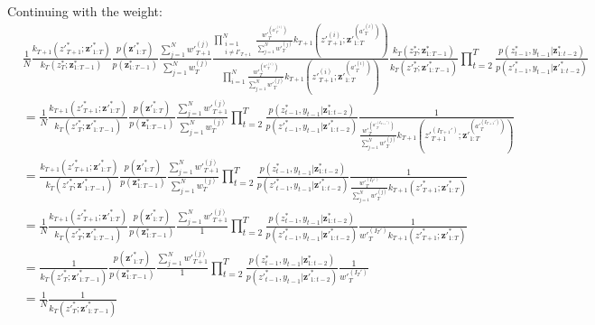\documentclass[11pt]{article}
\newcommand{\z}{\mathbf{z}}
\begin{document}
Continuing with the weight:
\begin{align*}
&
\frac{1}{N} \frac{
k_{T+1}({z'}_{T+1}^*; {\z'}_{1:T}^*) 
}{
k_T(z_T^*; \z_{1:T-1}^*)
}
\frac{p({\z'}_{1:T}^*)}{p({\z}_{1:T-1}^*)}
\frac{
\sum_{j=1}^N {w'}_{T+1}^{(j)}
}{
\sum_{j=1}^N {w}_{T}^{(j)}
}
\frac{
\displaystyle \prod_{\substack{i=1\\i \ne I'_{T+1}}}^N \frac{{w'}_{T}^{({a'}_{T}^{(i)})}}{\sum_{j=1}^N {w'}_{T}^{(j)}} k_{T+1}({z'}_{T+1}^{(i)}; {\z'}_{1:T}^{({a'}_{T}^{(i)})} )
}{
\displaystyle \prod_{i=1}^N \frac{{w'}_{T}^{({a'}_{T}^{(i)})}}{\sum_{j=1}^N {w'}_{T}^{(j)}} k_{T+1}({z'}_{T+1}^{(i)}; {\z'}_{1:T}^{({a'}_{T}^{(i)})} )
}
\frac{
k_T(z_T^*; \z_{1:T-1}^*)
}{
k_T({z'}_T^*; {\z'}_{1:T-1}^*)
}
\prod_{t=2}^T \frac{p(z_{t-1}^*, y_{t-1} | {\z}_{1:t-2}^{*})}{p({z'}_{t-1}^*, y_{t-1} | {\z'}_{1:t-2}^*)}\\
&=
\frac{1}{N} \frac{
k_{T+1}({z'}_{T+1}^*; {\z'}_{1:T}^*)
}{
k_T({z'}_T^*; {\z'}_{1:T-1}^*)
}
\frac{p({\z'}_{1:T}^*)}{p({\z}_{1:T-1}^*)}
\frac{
\sum_{j=1}^N {w'}_{T+1}^{(j)}
}{
\sum_{j=1}^N {w}_{T}^{(j)}
}
\prod_{t=2}^T \frac{p(z_{t-1}^*, y_{t-1} | {\z}_{1:t-2}^{*})}{p({z'}_{t-1}^*, y_{t-1} | {\z'}_{1:t-2}^*)}
\frac{1}{
\frac{{w'}_{T}^{({a'}_{T}^{(I_{T+1}')})}}{\sum_{j=1}^N {w'}_{T}^{(j)}} k_{T+1}({z'}_{T+1}^{(I_{T+1}')}; {\z'}_{1:T}^{({a'}_{T}^{(I_{T+1}')})} )
}\\
&=
\frac{
k_{T+1}({z'}_{T+1}^*; {\z'}_{1:T}^*)
}{
k_T({z'}_T^*; {\z'}_{1:T-1}^*)
}
\frac{p({\z'}_{1:T}^*)}{p({\z}_{1:T-1}^*)}
\frac{
\sum_{j=1}^N {w'}_{T+1}^{(j)}
}{
\sum_{j=1}^N {w}_{T}^{(j)}
}
\prod_{t=2}^T \frac{p(z_{t-1}^*, y_{t-1} | {\z}_{1:t-2}^{*})}{p({z'}_{t-1}^*, y_{t-1} | {\z'}_{1:t-2}^*)}
\frac{1}{
\frac{{w'}_{T}^{(I_T')}}{\sum_{j=1}^N {w'}_{T}^{(j)}} k_{T+1}({z'}_{T+1}^{*}; {\z'}_{1:T}^{*} )
}\\
&=
\frac{1}{N}
\frac{
k_{T+1}({z'}_{T+1}^*; {\z'}_{1:T}^*)
}{
k_T({z'}_T^*; {\z'}_{1:T-1}^*)
}
\frac{p({\z'}_{1:T}^*)}{p({\z}_{1:T-1}^*)}
\frac{
\sum_{j=1}^N {w'}_{T+1}^{(j)}
}{
1
}
\prod_{t=2}^T \frac{p(z_{t-1}^*, y_{t-1} | {\z}_{1:t-2}^{*})}{p({z'}_{t-1}^*, y_{t-1} | {\z'}_{1:t-2}^*)}
\frac{1}{
{w'}_{T}^{(I_T')} k_{T+1}({z'}_{T+1}^{*}; {\z'}_{1:T}^{*} )
}\\
&= \frac{
1
}{
k_T({z'}_T^*; {\z'}_{1:T-1}^*)
}
\frac{p({\z'}_{1:T}^*)}{p({\z}_{1:T-1}^*)}
\frac{
\sum_{j=1}^N {w'}_{T+1}^{(j)}
}{
1
}
\prod_{t=2}^T \frac{p(z_{t-1}^*, y_{t-1} | {\z}_{1:t-2}^{*})}{p({z'}_{t-1}^*, y_{t-1} | {\z'}_{1:t-2}^*)}
\frac{1}{
{w'}_{T}^{(I_T')}
}\\
&=
\frac{1}{N}
\frac{
1
}{
k_T({z'}_T^*; {\z'}_{1:T-1}^*)
}
\end{align*}
\end{document}
